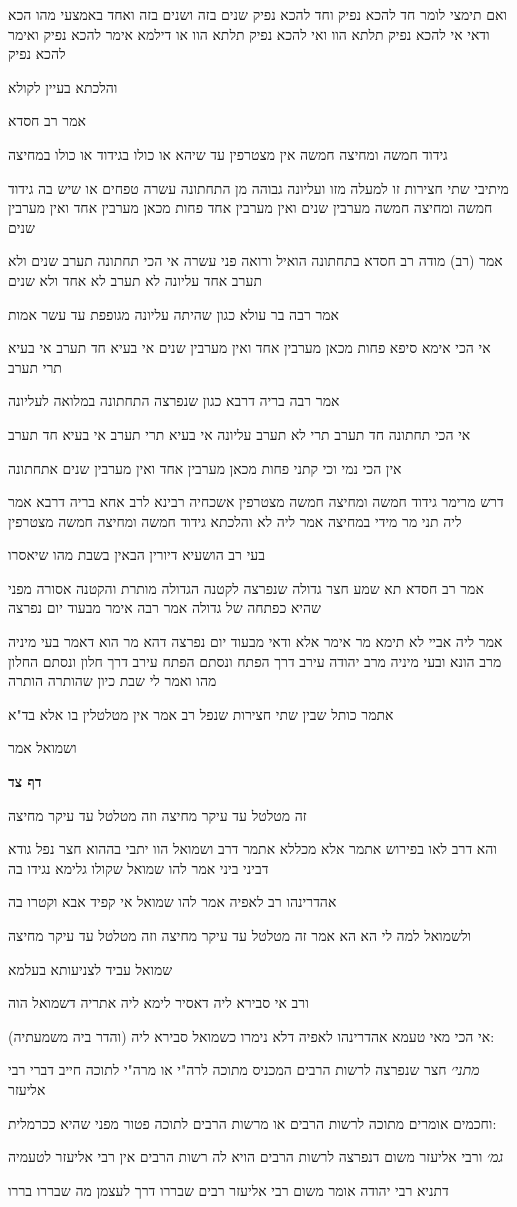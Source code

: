 \documentclass[12pt, openany]{book}
\newcommand{\sethebfont}{
\fontsize{10.5pt}{21.0pt} \selectfont
}
\newcommand{\textblock}[1]{
{\sethebfont #1\\}	
}
\newcommand{\sectname}{}
\newcommand{\newsection}[1]{
	\addcontentsline{toc}{section}{#1}
	\renewcommand{\sectname}{#1}	
	\vspace{-\baselineskip}
	\begin{center}
		\textbf{%
\fontsize{16pt}{16pt}\selectfont
			#1}
	\end{center}
	\vspace{-\baselineskip}
	\nopagebreak
}
\begin{document}
\textblock{ואם תימצי לומר חד להכא נפיק וחד להכא נפיק שנים בזה ושנים בזה ואחד באמצעי מהו הכא ודאי אי להכא נפיק תלתא הוו ואי להכא נפיק תלתא הוו או דילמא אימר להכא נפיק ואימר להכא נפיק}
\textblock{והלכתא בעיין לקולא}
\textblock{אמר רב חסדא}
\textblock{גידוד חמשה ומחיצה חמשה אין מצטרפין עד שיהא או כולו בגידוד או כולו במחיצה}
\textblock{מיתיבי שתי חצירות זו למעלה מזו ועליונה גבוהה מן התחתונה עשרה טפחים או שיש בה גידוד חמשה ומחיצה חמשה מערבין שנים ואין מערבין אחד פחות מכאן מערבין אחד ואין מערבין שנים}
\textblock{אמר (רב) מודה רב חסדא בתחתונה הואיל ורואה פני עשרה אי הכי תחתונה תערב שנים ולא תערב אחד עליונה לא תערב לא אחד ולא שנים}
\textblock{אמר רבה בר עולא כגון שהיתה עליונה מגופפת עד עשר אמות}
\textblock{אי הכי אימא סיפא פחות מכאן מערבין אחד ואין מערבין שנים אי בעיא חד תערב אי בעיא תרי תערב}
\textblock{אמר רבה בריה דרבא כגון שנפרצה התחתונה במלואה לעליונה}
\textblock{אי הכי תחתונה חד תערב תרי לא תערב עליונה אי בעיא תרי תערב אי בעיא חד תערב}
\textblock{אין הכי נמי וכי קתני פחות מכאן מערבין אחד ואין מערבין שנים אתחתונה}
\textblock{דרש מרימר גידוד חמשה ומחיצה חמשה מצטרפין אשכחיה רבינא לרב אחא בריה דרבא אמר ליה תני מר מידי במחיצה אמר ליה לא והלכתא גידוד חמשה ומחיצה חמשה מצטרפין}
\textblock{בעי רב הושעיא דיורין הבאין בשבת מהו שיאסרו}
\textblock{אמר רב חסדא תא שמע חצר גדולה שנפרצה לקטנה הגדולה מותרת והקטנה אסורה מפני שהיא כפתחה של גדולה אמר רבה אימר מבעוד יום נפרצה}
\textblock{אמר ליה אביי לא תימא מר אימר אלא ודאי מבעוד יום נפרצה דהא מר הוא דאמר בעי מיניה מרב הונא ובעי מיניה מרב יהודה עירב דרך הפתח ונסתם הפתח עירב דרך חלון ונסתם החלון מהו ואמר לי שבת כיון שהותרה הותרה}
\textblock{אתמר כותל שבין שתי חצירות שנפל רב אמר אין מטלטלין בו אלא בד"א}
\textblock{ושמואל אמר}
\newsection{דף צד}
\textblock{זה מטלטל עד עיקר מחיצה וזה מטלטל עד עיקר מחיצה}
\textblock{והא דרב לאו בפירוש אתמר אלא מכללא אתמר דרב ושמואל הוו יתבי בההוא חצר נפל גודא דביני ביני אמר להו שמואל שקולו גלימא נגידו בה}
\textblock{אהדרינהו רב לאפיה אמר להו שמואל אי קפיד אבא וקטרו בה}
\textblock{ולשמואל למה לי הא הא אמר זה מטלטל עד עיקר מחיצה וזה מטלטל עד עיקר מחיצה}
\textblock{שמואל עביד לצניעותא בעלמא}
\textblock{ורב אי סבירא ליה דאסיר לימא ליה אתריה דשמואל הוה}
\textblock{אי הכי מאי טעמא אהדרינהו לאפיה דלא נימרו כשמואל סבירא ליה (והדר ביה משמעתיה):}
\textblock{{\large\emph{מתני׳}} חצר שנפרצה לרשות הרבים המכניס מתוכה לרה"י או מרה"י לתוכה חייב דברי רבי אליעזר}
\textblock{וחכמים אומרים מתוכה לרשות הרבים או מרשות הרבים לתוכה פטור מפני שהיא ככרמלית:}
\textblock{{\large\emph{גמ׳}} ורבי אליעזר משום דנפרצה לרשות הרבים הויא לה רשות הרבים אין רבי אליעזר לטעמיה}
\textblock{דתניא רבי יהודה אומר משום רבי אליעזר רבים שבררו דרך לעצמן מה שבררו בררו}
\end{document}
